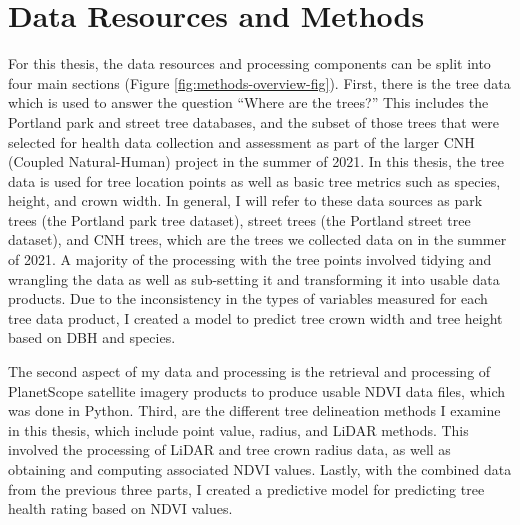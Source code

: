 \documentclass[12pt,twoside]{reedthesis}
\begin{document}
\hypertarget{data-methods}{%
\chapter{Data Resources and Methods}\label{data-methods}}

For this thesis, the data resources and processing components can be
split into four main sections (Figure \ref{fig:methods-overview-fig}).
First, there is the tree data which is used to answer the question
``Where are the trees?'' This includes the Portland park and street tree
databases, and the subset of those trees that were selected for health
data collection and assessment as part of the larger CNH (Coupled
Natural-Human) project in the summer of 2021. In this thesis, the tree
data is used for tree location points as well as basic tree metrics such
as species, height, and crown width. In general, I will refer to these
data sources as park trees (the Portland park tree dataset), street
trees (the Portland street tree dataset), and CNH trees, which are the
trees we collected data on in the summer of 2021. A majority of the
processing with the tree points involved tidying and wrangling the data
as well as sub-setting it and transforming it into usable data products.
Due to the inconsistency in the types of variables measured for each
tree data product, I created a model to predict tree crown width and
tree height based on DBH and species.

The second aspect of my data and processing is the retrieval and
processing of PlanetScope satellite imagery products to produce usable
NDVI data files, which was done in Python. Third, are the different tree
delineation methods I examine in this thesis, which include point value,
radius, and LiDAR methods. This involved the processing of LiDAR and
tree crown radius data, as well as obtaining and computing associated
NDVI values. Lastly, with the combined data from the previous three
parts, I created a predictive model for predicting tree health rating
based on NDVI values.
\end{document}

